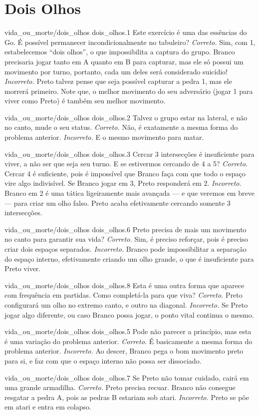 \chapter{Dois Olhos}

\emptypage

\problemAnswerDiagram
  {vida_ou_morte/dois_olhos}
  {dois_olhos.1}
  {Este exercício é uma das essências do Go. É possível permanecer incondicionalmente no tabuleiro?}
  {\emph{Correto.} Sim, com 1, estabelecemos ``dois olhos'', o que impossibilita a captura do grupo. Branco precisaria jogar tanto em A quanto em B para capturar, mas ele só possui um movimento por turno, portanto, cada um deles será considerado suicídio!}
  {\emph{Incorreto.} Preto talvez pense que seja possível capturar a pedra 1, mas ele morrerá primeiro. Note que, o melhor movimento do seu adversário (jogar 1 para viver como Preto) é também seu melhor movimento.}

\problemAnswerDiagram
  {vida_ou_morte/dois_olhos}
  {dois_olhos.2}
  {Talvez o grupo estar na lateral, e não no canto, mude o seu status.}
  {\emph{Correto.} Não, é exatamente a mesma forma do problema anterior.}
  {\emph{Incorreto.} E o mesmo movimento para matar.}

\problemAnswerDiagram
  {vida_ou_morte/dois_olhos}
  {dois_olhos.3}
  {Cercar 3 intersecções é insuficiente para viver, a não ser que seja seu turno. E se estivermos cercando de 4 a 5?}
  {\emph{Correto.} Cercar 4 é suficiente, pois é impossível que Branco faça com que todo o espaço vire algo indivisível. Se Branco jogar em 3, Preto responderá em 2.}
  {\emph{Incorreto.} Branco em 2 é uma tática ligeiramente mais avançada --- e que veremos em breve --- para criar um olho falso. Preto acaba efetivamente cercando somente 3 intersecções.}

\problemAnswerDiagram
  {vida_ou_morte/dois_olhos}
  {dois_olhos.6}
  {Preto precisa de mais um movimento no canto para garantir sua vida?}
  {\emph{Correto.} Sim, é preciso reforçar, pois é preciso criar dois espaços separados.}
  {\emph{Incorreto.} Branco pode impossibilitar a separação do espaço interno, efetivamente criando um olho grande, o que é insuficiente para Preto viver.}

\problemAnswerDiagram
  {vida_ou_morte/dois_olhos}
  {dois_olhos.8}
  {Esta é uma outra forma que aparece com frequência em partidas. Como completá-la para que viva?}
  {\emph{Correto.} Preto configurará um olho no extremo canto, e outro na diagonal.}
  {\emph{Incorreto.} Se Preto jogar algo diferente, ou caso Branco possa jogar, o ponto vital continua o mesmo.}

\problemAnswerDiagram
  {vida_ou_morte/dois_olhos}
  {dois_olhos.5}
  {Pode não parecer a princípio, mas esta é uma variação do problema anterior.}
  {\emph{Correto.} É basicamente a mesma forma do problema anterior.}
  {\emph{Incorreto.} Ao descer, Branco pega o bom movimento preto para si, e faz com que o espaço interno não possa ser dissociado.}

\problemAnswerDiagram
  {vida_ou_morte/dois_olhos}
  {dois_olhos.7}
  {Se Preto não tomar cuidado, cairá em uma grande armadilha.}
  {\emph{Correto.} Preto precisa recuar. Branco não consegue resgatar a pedra A, pois as pedras B estariam sob atari.}
  {\emph{Incorreto.} Preto se põe em atari e entra em colapso.}